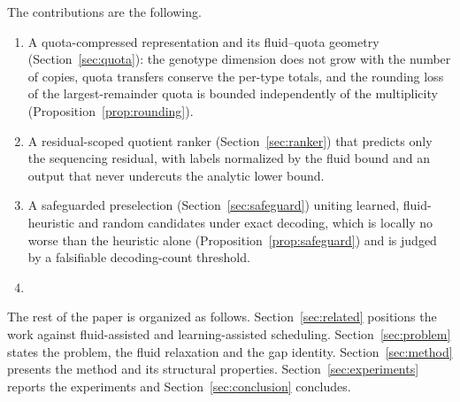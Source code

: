 The contributions are the following.
\begin{enumerate}
  \item A quota-compressed representation and its fluid--quota geometry (Section~\ref{sec:quota}): the genotype dimension does
  not grow with the number of copies, quota transfers conserve the per-type totals, and the rounding loss of the
  largest-remainder quota is bounded independently of the multiplicity (Proposition~\ref{prop:rounding}).
  \item A residual-scoped quotient ranker (Section~\ref{sec:ranker}) that predicts only the sequencing residual, with labels
  normalized by the fluid bound and an output that never undercuts the analytic lower bound.
  \item A safeguarded preselection (Section~\ref{sec:safeguard}) uniting learned, fluid-heuristic and random candidates under
  exact decoding, which is locally no worse than the heuristic alone (Proposition~\ref{prop:safeguard}) and is judged by a
  falsifiable decoding-count threshold.
  \item {}
\end{enumerate}

The rest of the paper is organized as follows. Section~\ref{sec:related} positions the work against fluid-assisted and
learning-assisted scheduling. Section~\ref{sec:problem} states the problem, the fluid relaxation and the gap identity.
Section~\ref{sec:method} presents the method and its structural properties. Section~\ref{sec:experiments} reports the
experiments and Section~\ref{sec:conclusion} concludes.
